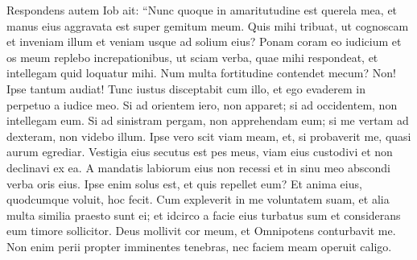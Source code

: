 \begin{biblechapter}  
\verse Respondens autem Iob ait: 
\verse “Nunc quoque in amaritutudine est querela mea, et manus eius aggravata est super gemitum meum. 
\verse Quis mihi tribuat, ut cognoscam et inveniam illum et veniam usque ad solium eius? 
\verse Ponam coram eo iudicium et os meum replebo increpationibus, 
\verse ut sciam verba, quae mihi respondeat, et intellegam quid loquatur mihi. 
\verse Num multa fortitudine contendet mecum? Non! Ipse tantum audiat! 
\verse Tunc iustus disceptabit cum illo, et ego evaderem in perpetuo a iudice meo. 
\verse Si ad orientem iero, non apparet; si ad occidentem, non intellegam eum. 
\verse Si ad sinistram pergam, non apprehendam eum; si me vertam ad dexteram, non videbo illum. 
\verse Ipse vero scit viam meam, et, si probaverit me, quasi aurum egrediar. 
\verse Vestigia eius secutus est pes meus, viam eius custodivi et non declinavi ex ea. 
\verse A mandatis labiorum eius non recessi et in sinu meo abscondi verba oris eius. 
\verse Ipse enim solus est, et quis repellet eum? Et anima eius, quodcumque voluit, hoc fecit. 
\verse Cum expleverit in me voluntatem suam, et alia multa similia praesto sunt ei; 
\verse et idcirco a facie eius turbatus sum et considerans eum timore sollicitor. 
\verse Deus mollivit cor meum, et Omnipotens conturbavit me. 
\verse Non enim perii propter imminentes tenebras, nec faciem meam operuit caligo. 
\end{biblechapter}

